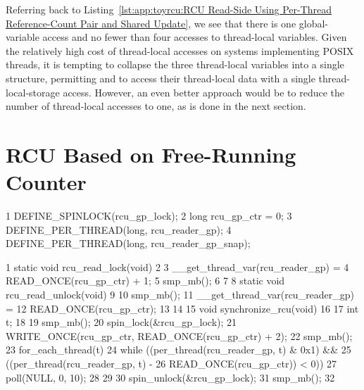 Referring back to
Listing~\ref{lst:app:toyrcu:RCU Read-Side Using Per-Thread Reference-Count Pair and Shared Update},
we see that there is one global-variable access and no fewer than four
accesses to thread-local variables.
Given the relatively high cost of thread-local accesses on systems
implementing POSIX threads, it is tempting to collapse the three
thread-local variables into a single structure, permitting
 and  to access their
thread-local data with a single thread-local-storage access.
However, an even better approach would be to reduce the number of
thread-local accesses to one, as is done in the next section.

\section{RCU Based on Free-Running Counter}
\label{sec:app:toyrcu:RCU Based on Free-Running Counter}

\begin{listing}[tbp]
{ \scriptsize
\begin{verbbox}
  1 DEFINE_SPINLOCK(rcu_gp_lock);
  2 long rcu_gp_ctr = 0;
  3 DEFINE_PER_THREAD(long, rcu_reader_gp);
  4 DEFINE_PER_THREAD(long, rcu_reader_gp_snap);
\end{verbbox}
}
\centering
\theverbbox
\caption{Data for Free-Running Counter Using RCU}
\label{lst:app:toyrcu:Data for Free-Running Counter Using RCU}
\end{listing}

\begin{listing}[tbp]
{ \scriptsize
\begin{verbbox}
 1 static void rcu_read_lock(void)
 2 {
 3   __get_thread_var(rcu_reader_gp) =
 4     READ_ONCE(rcu_gp_ctr) + 1;
 5   smp_mb();
 6 }
 7 
 8 static void rcu_read_unlock(void)
 9 {
10   smp_mb();
11   __get_thread_var(rcu_reader_gp) =
12     READ_ONCE(rcu_gp_ctr);
13 }
14 
15 void synchronize_rcu(void)
16 {
17   int t;
18 
19   smp_mb();
20   spin_lock(&rcu_gp_lock);
21   WRITE_ONCE(rcu_gp_ctr, READ_ONCE(rcu_gp_ctr) + 2);
22   smp_mb();
23   for_each_thread(t) {
24     while ((per_thread(rcu_reader_gp, t) & 0x1) &&
25             ((per_thread(rcu_reader_gp, t) -
26               READ_ONCE(rcu_gp_ctr)) < 0)) {
27       poll(NULL, 0, 10);
28     }
29   }
30   spin_unlock(&rcu_gp_lock);
31   smp_mb();
32 }
\end{verbbox}
}
\centering
\theverbbox
\caption{Free-Running Counter Using RCU}
\label{lst:app:toyrcu:Free-Running Counter Using RCU}
\end{listing}

